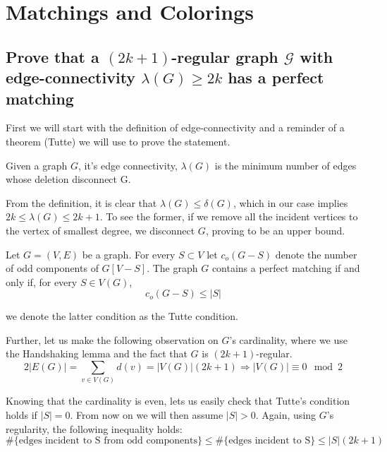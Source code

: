 \section{Matchings and Colorings}


\subsection[Matchins 1]{Prove that a $(2k+1)$-regular graph $\mathcal{G}$ with edge-connectivity $\lambda(G) \geq 2k$ has a perfect matching}

\vspace{3pt}

First we will start with the definition of edge-connectivity and a reminder of a theorem (Tutte) we will use to prove the statement.

\begin{definition}
    Given a graph $G$, it's edge connectivity, $\lambda(G)$ is the minimum number of edges whose deletion disconnect G.
\end{definition}

From the definition, it is clear that $\lambda(G) \leq \delta(G)$, which in our case implies $2k \leq \lambda(G) \leq 2k + 1$. To see the former, if we remove all the incident vertices to the vertex of smallest degree, we disconnect $G$, proving to be an upper bound.

\begin{theorem}[Tutte]
    Let $G = (V, E)$ be a graph. For every $S \subset V$ let $c_o(G - S)$ denote the number of odd components of $G[V-S]$. The graph $G$ contains a perfect matching if and only if, for every $S \in V(G)$,
    $$c_o(G-S) \leq |S| $$
\end{theorem}
we denote the latter condition as the Tutte condition.

Further, let us make the following observation on $G$'s cardinality, where we use the Handshaking lemma and the fact that $G$ is $(2k + 1)$-regular.
$$2|E(G)| = \sum_{v \in V(G)} d(v) = |V(G)|(2k + 1) \Rightarrow |V(G)| \equiv 0 \mod 2$$

Knowing that the cardinality is even, lets us easily check that Tutte's condition holds if $|S| = 0$. From now on we will then assume $|S| > 0$. Again, using $G$'s regularity, the following inequality holds:
\begin{equation}\label{edge-ineq}
\#\lbrace\text{edges incident to S from odd components}\rbrace \leq \#\lbrace\text{edges incident to S}\rbrace \leq |S|(2k + 1)
\end{equation}

